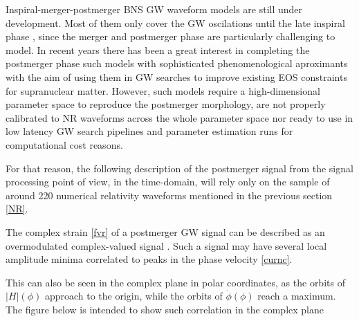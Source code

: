 Inspiral-merger-postmerger BNS GW waveform models are still under development. Most of them only cover the GW oscilations until the late inspiral phase \cite{Hinderer:2009ca,Damour:2012yf,PhysRevD.96.121501,Dietrich:2018uni}, since the merger and postmerger phase are particularly challenging to model. In recent years there has been a great interest in completing the postmerger phase such models with sophisticated phenomenological aproximants \cite{Breschi:2019srl, Tsang:2019esi, Soultanis:2021oia, https://doi.org/10.48550/arxiv.2205.09112} with the aim of using them in GW searches to improve existing EOS constraints for supranuclear matter. However, such models require a high-dimensional parameter space to reproduce the postmerger morphology, are not properly calibrated to NR waveforms across the whole parameter space nor ready to use in low latency GW search pipelines and parameter estimation runs for computational cost reasons. 

For that reason, the following description of the postmerger signal from the signal processing point of view, in the time-domain, will rely only on the sample of around 220 numerical relativity waveforms mentioned in the previous section \ref{NR}.


The complex strain \ref{fvr} of a postmerger GW signal can be described as an overmodulated complex-valued signal \cite{Kastaun:2016elu}. Such a signal may have several local amplitude minima correlated to peaks in the phase velocity \ref{curnc}.

This can also be seen in the complex plane in polar coordinates, as the orbits of $|H|(\phi)$ approach to the origin, while the orbits of $\dot{\phi}(\phi)$ reach a maximum. The figure below is intended to show such correlation in the complex plane


